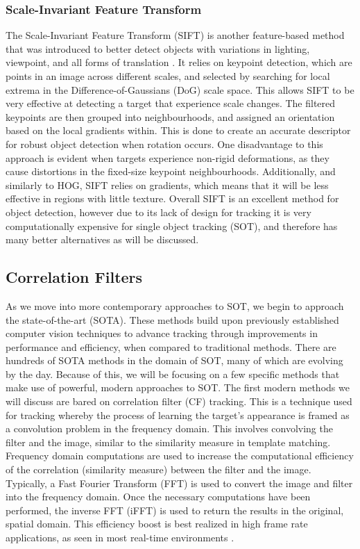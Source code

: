 \documentclass[11pt, letterpaper]{article}
\begin{document}
\subsubsection{Scale-Invariant Feature Transform}

The Scale-Invariant Feature Transform (SIFT) is another feature-based method that was introduced to better detect objects with variations in lighting, viewpoint, and all forms of translation \cite{lowe_object_1999}. It relies on keypoint detection, which are points in an image across different scales, and selected by searching for local extrema in the Difference-of-Gaussians (DoG) scale space. This allows SIFT to be very effective at detecting a target that experience scale changes. The filtered keypoints are then grouped into neighbourhoods, and assigned an orientation based on the local gradients within. This is done to create an accurate descriptor for robust object detection when rotation occurs. One disadvantage to this approach is evident when targets experience non-rigid deformations, as they cause distortions in the fixed-size keypoint neighbourhoods. Additionally, and similarly to HOG, SIFT relies on gradients, which means that it will be less effective in regions with little texture. Overall SIFT is an excellent method for object detection, however due to its lack of design for tracking it is very computationally expensive for single object tracking (SOT), and therefore has many better alternatives as will be discussed. 

\subsection{Correlation Filters}

As we move into more contemporary approaches to SOT, we begin to approach the state-of-the-art (SOTA). These methods build upon previously established computer vision techniques to advance tracking through improvements in performance and efficiency, when compared to traditional methods. There are hundreds of SOTA methods in the domain of SOT, many of which are evolving by the day. Because of this, we will be focusing on a few specific methods that make use of powerful, modern approaches to SOT.
The first modern methods we will discuss are bared on correlation filter (CF) tracking. This is a technique used for tracking whereby the process of learning the target's appearance is framed as a convolution problem in the frequency domain. This involves convolving the filter and the image, similar to the similarity measure in template matching. Frequency domain computations are used to increase the computational efficiency of the correlation (similarity measure) between the filter and the image. Typically, a Fast Fourier Transform (FFT) is used to convert the image and filter into the frequency domain. Once the necessary computations have been performed, the inverse FFT (iFFT) is used to return the results in the original, spatial domain. This efficiency boost is best realized in high frame rate applications, as seen in most real-time environments \cite{noauthor_visual_2010}.
\end{document}

